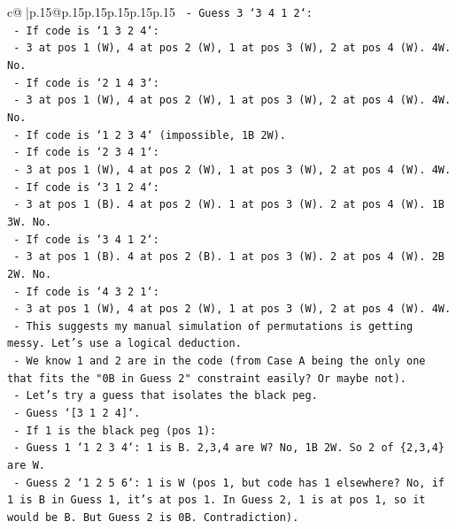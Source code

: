 \documentclass{article}
\begin{document}
{\begin{supertabular}{c@{$\;$}|p{.15\linewidth}@{}p{.15\linewidth}p{.15\linewidth}p{.15\linewidth}p{.15\linewidth}p{.15\linewidth}}
{{{\texttt{            {-} Guess 3 `3 4 1 2`:} \\
\texttt{                {-} If code is `1 3 2 4`:} \\
\texttt{                    {-} 3 at pos 1 (W), 4 at pos 2 (W), 1 at pos 3 (W), 2 at pos 4 (W). 4W. No.} \\
\texttt{                {-} If code is `2 1 4 3`:} \\
\texttt{                    {-} 3 at pos 1 (W), 4 at pos 2 (W), 1 at pos 3 (W), 2 at pos 4 (W). 4W. No.} \\
\texttt{                {-} If code is `1 2 3 4` (impossible, 1B 2W).} \\
\texttt{                {-} If code is `2 3 4 1`:} \\
\texttt{                    {-} 3 at pos 1 (W), 4 at pos 2 (W), 1 at pos 3 (W), 2 at pos 4 (W). 4W.} \\
\texttt{                {-} If code is `3 1 2 4`:} \\
\texttt{                    {-} 3 at pos 1 (B). 4 at pos 2 (W). 1 at pos 3 (W). 2 at pos 4 (W). 1B 3W. No.} \\
\texttt{                {-} If code is `3 4 1 2`:} \\
\texttt{                    {-} 3 at pos 1 (B). 4 at pos 2 (B). 1 at pos 3 (W). 2 at pos 4 (W). 2B 2W. No.} \\
\texttt{                {-} If code is `4 3 2 1`:} \\
\texttt{                    {-} 3 at pos 1 (W), 4 at pos 2 (W), 1 at pos 3 (W), 2 at pos 4 (W). 4W.} \\
\texttt{        {-} This suggests my manual simulation of permutations is getting messy. Let's use a logical deduction.} \\
\texttt{        {-} We know 1 and 2 are in the code (from Case A being the only one that fits the "0B in Guess 2" constraint easily? Or maybe not).} \\
\texttt{        {-} Let's try a guess that isolates the black peg.} \\
\texttt{        {-} Guess `{[}3 1 2 4{]}`.} \\
\texttt{        {-} If 1 is the black peg (pos 1):} \\
\texttt{            {-} Guess 1 `1 2 3 4`: 1 is B. 2,3,4 are W? No, 1B 2W. So 2 of \{2,3,4\} are W.} \\
\texttt{            {-} Guess 2 `1 2 5 6`: 1 is W (pos 1, but code has 1 elsewhere? No, if 1 is B in Guess 1, it's at pos 1. In Guess 2, 1 is at pos 1, so it would be B. But Guess 2 is 0B. Contradiction).} \\
}}}
\end{supertabular}}
\end{document}
